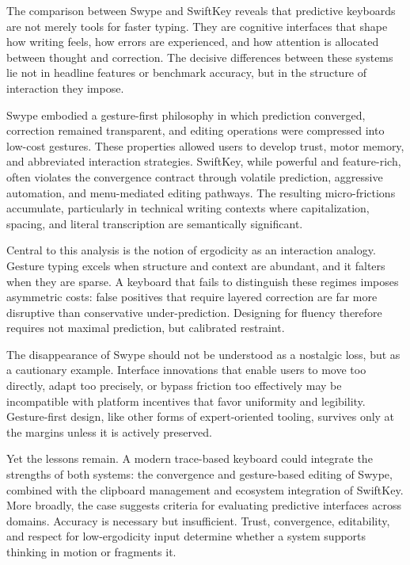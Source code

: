 \documentclass[11pt]{article}
\begin{document}
The comparison between Swype and SwiftKey reveals that predictive keyboards are not merely tools for faster typing. They are cognitive interfaces that shape how writing feels, how errors are experienced, and how attention is allocated between thought and correction. The decisive differences between these systems lie not in headline features or benchmark accuracy, but in the structure of interaction they impose.

Swype embodied a gesture-first philosophy in which prediction converged, correction remained transparent, and editing operations were compressed into low-cost gestures. These properties allowed users to develop trust, motor memory, and abbreviated interaction strategies. SwiftKey, while powerful and feature-rich, often violates the convergence contract through volatile prediction, aggressive automation, and menu-mediated editing pathways. The resulting micro-frictions accumulate, particularly in technical writing contexts where capitalization, spacing, and literal transcription are semantically significant.

Central to this analysis is the notion of ergodicity as an interaction analogy. Gesture typing excels when structure and context are abundant, and it falters when they are sparse. A keyboard that fails to distinguish these regimes imposes asymmetric costs: false positives that require layered correction are far more disruptive than conservative under-prediction. Designing for fluency therefore requires not maximal prediction, but calibrated restraint.

The disappearance of Swype should not be understood as a nostalgic loss, but as a cautionary example. Interface innovations that enable users to move too directly, adapt too precisely, or bypass friction too effectively may be incompatible with platform incentives that favor uniformity and legibility. Gesture-first design, like other forms of expert-oriented tooling, survives only at the margins unless it is actively preserved.

Yet the lessons remain. A modern trace-based keyboard could integrate the strengths of both systems: the convergence and gesture-based editing of Swype, combined with the clipboard management and ecosystem integration of SwiftKey. More broadly, the case suggests criteria for evaluating predictive interfaces across domains. Accuracy is necessary but insufficient. Trust, convergence, editability, and respect for low-ergodicity input determine whether a system supports thinking in motion or fragments it.
\end{document}
